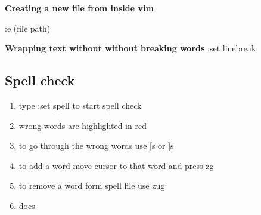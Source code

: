 \textbf{Creating a new file from inside vim}

:e (file path)



\textbf{Wrapping text without without breaking words}
:set linebreak

\subsection{Spell check}

\begin{enumerate}
    \item type :set spell to start spell check
    \item wrong words are highlighted in red
    \item to go through the wrong words use [s or ]s
    \item to add a word move cursor to that word and press zg
    \item to remove a word form spell file use zug
    \item \href{http://vimdoc.sourceforge.net/htmldoc/spell.html}{docs}
\end{enumerate}

